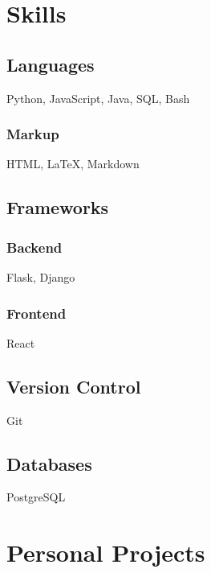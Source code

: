 \documentclass{article}
\begin{document}
\begin{paracol}{2}
  \switchcolumn

  \section{Skills}
  \subsection{Languages}
  Python, JavaScript, Java, SQL, Bash
  \subsubsection{Markup}
  HTML, {\LaTeX}, Markdown
  \subsection{Frameworks}
  \subsubsection{Backend}
  Flask, Django
  \subsubsection{Frontend}
  React
  \subsection{Version Control}
  Git
  \subsection{Databases}
  PostgreSQL

  \section{Personal Projects}

\end{paracol}
\end{document}
